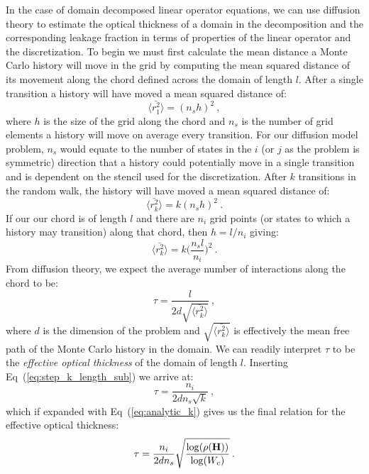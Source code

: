 \documentclass{mc2013}
\begin{document}
In the case of domain decomposed linear operator equations, we can use
diffusion theory to estimate the optical thickness of a domain in the
decomposition and the corresponding leakage fraction in terms of
properties of the linear operator and the discretization. To begin we
must first calculate the mean distance a Monte Carlo history will move
in the grid by computing the mean squared distance of its movement
along the chord defined across the domain of length $l$. After a
single transition a history will have moved a mean squared distance
of:
\begin{equation}
  \langle \bar{r_1^2} \rangle = (n_s h)^2\:,
  \label{eq:step_1_length}
\end{equation}
where $h$ is the size of the grid along the chord and $n_s$ is the
number of grid elements a history will move on average every
transition. For our diffusion model problem, $n_s$ would equate to the
number of states in the $i$ (or $j$ as the problem is symmetric)
direction that a history could potentially move in a single transition
and is dependent on the stencil used for the discretization. After $k$
transitions in the random walk, the history will have moved a mean
squared distance of:
\begin{equation}
  \langle \bar{r_k^2} \rangle = k (n_s h)^2\:.
  \label{eq:step_k_length}
\end{equation}
If our our chord is of length $l$ and there are $n_i$ grid points (or
states to which a history may transition) along that chord, then $h =
l / n_i$ giving:
\begin{equation}
  \langle \bar{r_k^2} \rangle = k \Bigg(\frac{n_s l}{n_i}\Bigg)^2\:.
  \label{eq:step_k_length_sub}
\end{equation}
From diffusion theory, we expect the average number of interactions
along the chord to be:
\begin{equation}
  \tau = \frac{l}{2 d \sqrt{\langle \bar{r_k^2} \rangle}}\:,
  \label{eq:optical_thickness_1}
\end{equation}
where $d$ is the dimension of the problem and $\sqrt{\langle
  \bar{r_k^2} \rangle}$ is effectively the mean free path of the Monte
Carlo history in the domain. We can readily interpret $\tau$ to be the
\textit{effective optical thickness} of the domain of length
$l$. Inserting Eq~(\ref{eq:step_k_length_sub}) we arrive at:
\begin{equation}
  \tau = \frac{n_i}{2 d n_s \sqrt{k}}\:,
  \label{eq:optical_thickness_2}
\end{equation}
which if expanded with Eq~(\ref{eq:analytic_k}) gives us the final
relation for the effective optical thickness:
\begin{equation}
  \tau = \frac{n_i}{2 d n_s}
  \sqrt{\frac{\log(\rho(\mathbf{H}))}{\log(W_c)}}\:.
  \label{eq:optical_thickness_3}
\end{equation}
\end{document}
